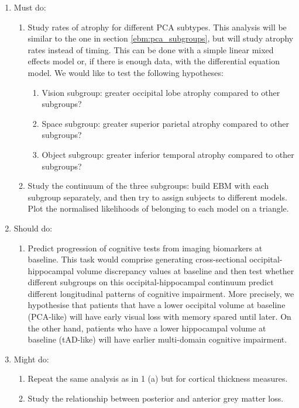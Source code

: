 \begin{enumerate}
 \item Must do:
\begin{enumerate}
 \item Study rates of atrophy for different PCA subtypes. This analysis will be similar to the one in section \ref{ebm:pca_subgroups}, but will study atrophy rates instead of timing. This can be done with a simple linear mixed effects model or, if there is enough data, with the differential equation model. We would like to test the following hypotheses:
 \begin{enumerate}
  \item Vision subgroup: greater occipital lobe atrophy compared to other subgroups?
  \item Space subgroup: greater superior parietal atrophy compared to other subgroups?
  \item Object subgroup: greater inferior temporal atrophy compared to other subgroups?
 \end{enumerate}
 \item Study the continuum of the three subgroups: build EBM with each subgroup separately, and then try to assign subjects to different models. Plot the normalised likelihoods of belonging to each model on a triangle. 
\end{enumerate}
 \item Should do:
 \begin{enumerate}
 \item Predict progression of cognitive tests from imaging biomarkers at baseline. This task would comprise generating cross-sectional occipital-hippocampal volume discrepancy values at baseline and then test whether different subgroups on this occipital-hippocampal continuum predict different longitudinal patterns of cognitive impairment. More precisely, we hypothesise that patients that have a lower occipital volume at baseline (PCA-like) will have early visual loss with memory spared until later. On the other hand, patients who have a lower hippocampal volume at baseline (tAD-like) will have earlier multi-domain cognitive impairment. 
 \end{enumerate}
 \item Might do:
 \begin{enumerate}
  \item Repeat the same analysis as in 1 (a) but for cortical thickness measures. 
  \item Study the relationship between posterior and anterior grey matter loss. 

\end{enumerate}
\end{enumerate}
